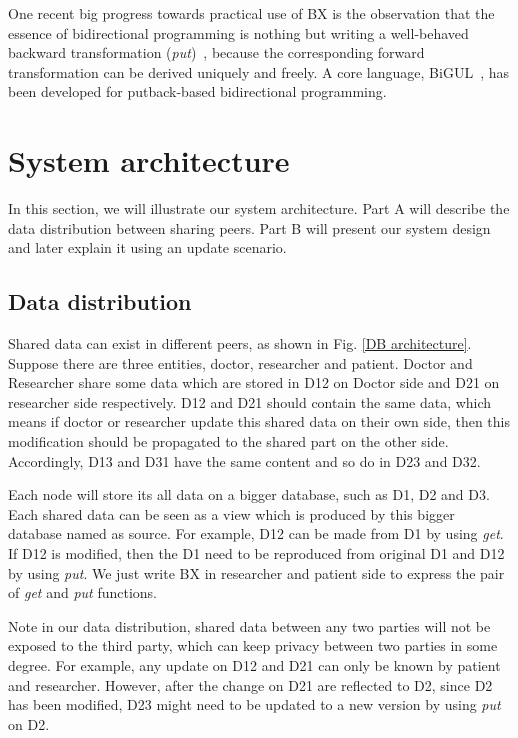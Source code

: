 \documentclass[conference]{IEEEtran}
\begin{document}
	One recent big progress towards practical use of BX is the observation that the essence of bidirectional programming is nothing but writing a well-behaved backward transformation (\emph{put})~\cite{hu2014validity, pacheco2014monadic, pacheco2014biflux}, because the corresponding forward transformation can be derived uniquely and freely. A core language, BiGUL~\cite{bigul}, has been developed for putback-based bidirectional programming.
    
\section{System architecture}

In this section, we will illustrate our system architecture. Part A will describe the data distribution between sharing peers. Part B will present our system design and later explain it using an update scenario.

\subsection{Data distribution}

Shared data can exist in different peers, as shown in Fig. \ref{DB architecture}. Suppose there are three entities, doctor, researcher and patient. Doctor and Researcher share some data which are stored in D12 on Doctor side and D21 on researcher side respectively. D12 and D21 should contain the same data, which means if doctor or researcher update this shared data on their own side, then this modification should be propagated to the shared part on the other side. Accordingly, D13 and D31 have the same content and so do in D23 and D32.

Each node will store its all data on a bigger database, such as D1, D2 and D3. Each shared data can be seen as a view which is produced by this bigger database named as source. For example, D12 can be made from D1 by using \emph{get}. If D12 is modified, then the D1 need to be reproduced from original D1 and D12 by using \emph{put}. We just write BX in researcher and patient side to express the pair of \emph{get} and \emph{put} functions.

Note in our data distribution, shared data between any two parties will not be exposed to the third party, which can keep privacy between two parties in some degree. For example, any update on D12 and D21 can only be known by patient and researcher. However, after the change on D21 are reflected to D2, since D2 has been modified, D23 might need to be updated to a new version by using \emph{put} on D2.
\end{document}

